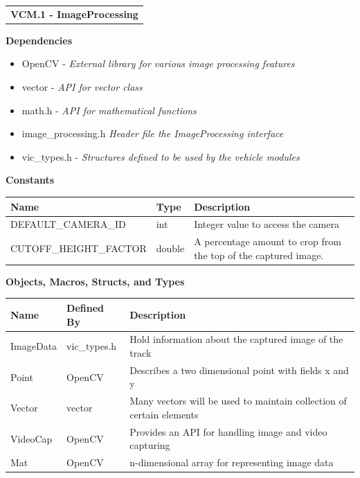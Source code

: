 \documentclass [10pt]{article}
\begin{document}
\begin{longtable}{p{}}

\rowcolor{subsectionC}\textbf{VCM.1 - ImageProcessing} \\
\end{longtable}



\textbf{Dependencies} 
\begin{itemize} 
\itemsep 0em 
\item OpenCV - \textit{External library for various image processing features}
\item vector - \textit{API for vector class}
\item math.h - \textit{API for mathematical functions}
\item image\_processing.h \textit{Header file the ImageProcessing interface}
\item vic\_types.h - \textit{Structures defined to be used by the vehicle modules}
\end{itemize}

\textbf{Constants}\\
\begin{longtable}{| p{ }  p{ } p{}|}  \hline

 \textbf{Name} & \textbf{Type} & \textbf{Description} \\ \hline

 \rowcolor{tableCell}DEFAULT\_CAMERA\_ID & int & Integer value to access the camera  \\ \hline
  CUTOFF\_HEIGHT\_FACTOR & double & A percentage amount to crop from the top of the captured image.  \\
\hline
\end{longtable}





\textbf{Objects, Macros, Structs, and Types}\\ 
\begin{longtable}{ |p{ }  p{ } p{}|} \hline

 \textbf{Name} & \textbf{Defined By} & \textbf{Description} \\ \hline

\rowcolor{tableCell} ImageData & vic\_types.h &  Hold  information about the captured image of the track \\ \hline
 Point & OpenCV & Describes a two dimensional point with fields x and y \\ \hline
\rowcolor{tableCell} Vector & vector & Many vectors will be used to maintain collection of certain elements \\ \hline
 VideoCap & OpenCV  & Provides an API for handling image and video capturing \\ \hline
\rowcolor{tableCell} Mat & OpenCV  & n-dimensional array for representing image data \\ \hline

\end{longtable}
\end{document}
